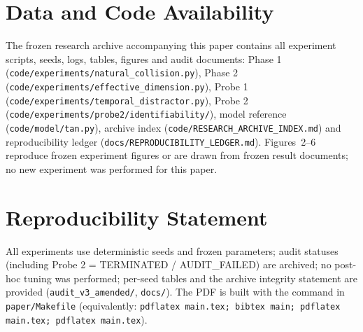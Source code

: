 \documentclass[11pt]{article}
\begin{document}
\begin{table}[t]
  \centering
  \caption{Probe 1 v3: per-seed balanced three-class accuracy with
  amended-audit statuses (24 cells; source:
  \texttt{audit\_\allowbreak{}v3\_\allowbreak{}amended/PER\_\allowbreak{}SEED\_\allowbreak{}AUDIT.md}, frozen).  B3
  20260906 clean $= 0.470$ is marked INVALID\_\allowbreak{}FOR\_\allowbreak{}INTERPRETATION
  (lo-blind); at-chance collapsed cells are PASS\_\allowbreak{}WITH\_\allowbreak{}FLAG.}
  
  \label{tab:probe1}
\end{table}

\begin{table}[t]
  \centering
  \caption{Probe 2 identifiability audit summary (frozen).  Status:
  TERMINATED / AUDIT\_\allowbreak{}FAILED: a mechanistic identifiability boundary,
  not an incomplete experiment.}
  
  \label{tab:probe2}
\end{table}

\begin{table}[t]
  \centering
  \caption{Claim ledger of this paper (evidence levels follow the frozen
  archive claim ledger, \texttt{docs/CLAIM\_\allowbreak{}LEDGER.md}).}
  
  \label{tab:claims}
\end{table}

\newpage
\section*{Data and Code Availability}
The frozen research archive accompanying this paper contains all
experiment scripts, seeds, logs, tables, figures and audit documents:
Phase 1 (\texttt{code/experiments/natural\_\allowbreak{}collision.py}), Phase 2
(\texttt{code/experiments/effective\_\allowbreak{}dimension.py}), Probe 1
(\texttt{code/experiments/temporal\_\allowbreak{}distractor.py}), Probe 2
(\texttt{code/\allowbreak{}experiments/\allowbreak{}probe2/\allowbreak{}identifiability/\allowbreak{}}), model reference
(\texttt{code/\allowbreak{}model/\allowbreak{}tan.py}), archive index
(\texttt{code/RESEARCH\_\allowbreak{}ARCHIVE\_\allowbreak{}INDEX.md}) and reproducibility ledger
(\texttt{docs/REPRODUCIBILITY\_\allowbreak{}LEDGER.md}).  Figures~2--6 reproduce
frozen experiment figures or are drawn from frozen result documents; no
new experiment was performed for this paper.

\section*{Reproducibility Statement}
All experiments use deterministic seeds and frozen parameters; audit
statuses (including Probe 2 = TERMINATED / AUDIT\_\allowbreak{}FAILED) are archived;
no post-hoc tuning was performed; per-seed tables and the archive
integrity statement are provided (\texttt{audit\_\allowbreak{}v3\_\allowbreak{}amended/},
\texttt{docs/\allowbreak{}}).  The PDF is built with the command in
\texttt{paper/\allowbreak{}Makefile} (equivalently: \texttt{pdflatex main.tex;
bibtex main; pdflatex main.tex; pdflatex main.tex}).
\end{document}
